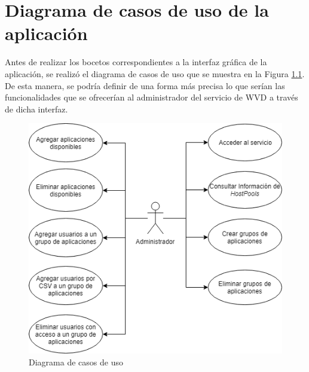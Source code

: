\chapter{Diagrama de casos de uso de la aplicación}
\label{anx:diagrama_cdu}

Antes de realizar los bocetos correspondientes a la interfaz gráfica de la aplicación, se realizó el diagrama de casos de uso que se muestra en la Figura \ref{fig:diagrama_cdu}. De esta manera, se podría definir de una forma más precisa lo que serían las funcionalidades que se ofrecerían al administrador del servicio de \acs{WVD} a través de dicha interfaz.

\begin{figure}[h]
  \centering
  \includegraphics[width=0.7\linewidth]{figures/images/script/Diagrama_CDU.png}
  \caption{Diagrama de casos de uso}
  \label{fig:diagrama_cdu}
\end{figure}